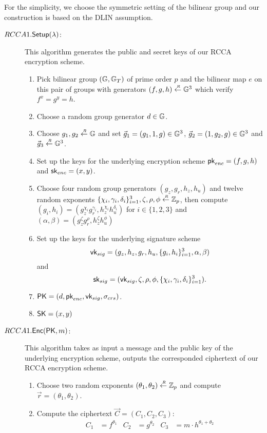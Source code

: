 For the simplicity, we choose the symmetric setting of the bilinear group and our construction is based on the DLIN assumption.

\begin{description}
\item[\boldmath$RCCA1.{\mathsf{Setup}}(\lambda)$:] This algorithm generates the public and secret keys of our RCCA encryption scheme.
  \begin{enumerate}
  \item Pick bilinear group $(\mathbb{G}, \mathbb{G}_T)$ of prime order $p$ and the bilinear map $e$ on this pair of groups with generators $(f,g,h) \stackrel{{\scriptscriptstyle \mkern4mu R}}{\gets} \mathbb{G}^3$ which verify $f^x = g^y = h$.
  \item Choose a random group generator $d \in \mathbb{G}$.
  \item Choose $g_1,g_2 \stackrel{{\scriptscriptstyle \mkern4mu R}}{\gets} \mathbb{G}$ and set $\vec{g}_1 = (g_1,1,g) \in \mathbb{G}^3$, $\vec{g}_2 = (1,g_2,g) \in \mathbb{G}^3$ and $\vec{g}_3 \stackrel{{\scriptscriptstyle \mkern4mu R}}{\gets} \mathbb{G}^3$.
  \item Set up the keys for the underlying encryption scheme $\mathsf{pk}_{enc} = (f,g,h)$ and $\mathsf{sk}_{enc} = (x,y)$.
  \item Choose four random group generators $(g_z, g_r, h_z, h_u)$ and twelve random exponents $\{\chi_i, \gamma_i, \delta_i\}_{i = 1}^3, \zeta, \rho, \phi \stackrel{{\scriptscriptstyle \mkern4mu R}}{\gets} \mathbb{Z}_p$, then compute $(g_i,h_i) = (g_z^{\chi_i}g_r^{\gamma_i}, h_z^{\chi_i}h_u^{\delta_i})$ for $ i \in \{1,2,3\}$ and $(\alpha,\beta) = (g_z^\zeta g_r^\rho, h_z^\zeta h_u^\phi)$
  \item Set up the keys for the underlying signature scheme
    $$\mathsf{vk}_{sig} = (g_z, h_z, g_r, h_u, \{g_i, h_i\}_{i = 1}^3, \alpha ,\beta)$$
    and
    $$\mathsf{sk}_{sig} = (\mathsf{vk}_{sig}, \zeta, \rho, \phi, \{\chi_i, \gamma_i, \delta_i\}_{i = 1}^3).$$
  \item $\mathsf{PK} = (d,\mathsf{pk}_{enc}, \mathsf{vk}_{sig}, \sigma_{crs})$.
  \item $\mathsf{SK} = (x, y)$
  \end{enumerate}

\item[\boldmath$RCCA1.{\mathsf{Enc}}(\mathsf{PK},m)$:] This algorithm takes as input a message and the public key of the underlying encryption scheme, outputs the corresponded ciphertext of our RCCA encryption scheme.
  \begin{enumerate}
  \item Choose two random exponents $(\theta_1, \theta_2) \stackrel{{\scriptscriptstyle \mkern4mu R}}{\gets} \mathbb{Z}_p$ and compute $ \vec{r} = (\theta_1, \theta_2)$.
  \item Compute the ciphertext $\vec{C} = (C_1, C_2, C_3)$:
    \begin{align*}
      C_1 &= f^{\theta_1} & C_2 &= g^{\theta_2} & C_3 &= m \cdot h^{\theta_1+\theta_2}
    \end{align*}


\end{enumerate}
\end{description}

